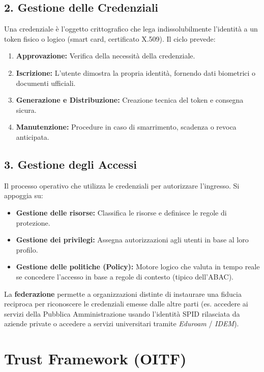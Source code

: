 \subsection{2. Gestione delle Credenziali}
Una credenziale è l'oggetto crittografico che lega indissolubilmente l'identità a un token fisico o logico (smart card, certificato X.509). Il ciclo prevede:
\begin{enumerate}
    \item \textbf{Approvazione:} Verifica della necessità della credenziale.
    \item \textbf{Iscrizione:} L'utente dimostra la propria identità, fornendo dati biometrici o documenti ufficiali.
    \item \textbf{Generazione e Distribuzione:} Creazione tecnica del token e consegna sicura.
    \item \textbf{Manutenzione:} Procedure in caso di smarrimento, scadenza o revoca anticipata.
\end{enumerate}

\subsection{3. Gestione degli Accessi}
Il processo operativo che utilizza le credenziali per autorizzare l'ingresso. Si appoggia su:
\begin{itemize}
    \item \textbf{Gestione delle risorse:} Classifica le risorse e definisce le regole di protezione.
    \item \textbf{Gestione dei privilegi:} Assegna autorizzazioni agli utenti in base al loro profilo.
    \item \textbf{Gestione delle politiche (Policy):} Motore logico che valuta in tempo reale se concedere l'accesso in base a regole di contesto (tipico dell'ABAC).
\end{itemize}

\begin{notebox}
La \textbf{federazione} permette a organizzazioni distinte di instaurare una fiducia reciproca per riconoscere le credenziali emesse dalle altre parti (es. accedere ai servizi della Pubblica Amministrazione usando l'identità SPID rilasciata da aziende private o accedere a servizi universitari tramite \textit{Eduroam} / \textit{IDEM}).
\end{notebox}


\section{Trust Framework (OITF)}

